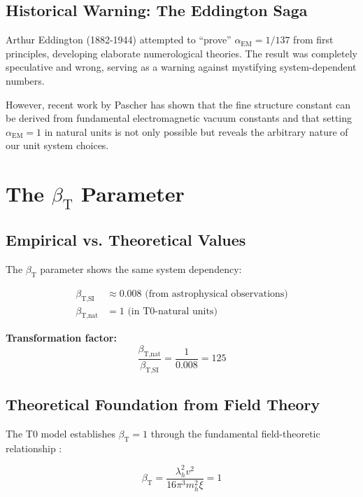 \documentclass[12pt,a4paper]{article}
\newcommand{\xipar}{\xi}
\newcommand{\lambdah}{\lambda_h}
\newcommand{\pichar}{\pi}
\newcommand{\betaTSI}{\beta_{\text{T,SI}}}
\newcommand{\betaTnat}{\beta_{\text{T,nat}}}
\begin{document}
	\subsection{Historical Warning: The Eddington Saga}
	\label{subsec:eddington_warning}
	
	Arthur Eddington (1882-1944) attempted to ``prove'' $\alpha_{\text{EM}} = 1/137$ from first principles, developing elaborate numerological theories. The result was completely speculative and wrong, serving as a warning against mystifying system-dependent numbers.
	
	However, recent work by Pascher \cite{pascher_feinstruktur_2025} has shown that the fine structure constant can be derived from fundamental electromagnetic vacuum constants and that setting $\alpha_{\text{EM}} = 1$ in natural units is not only possible but reveals the arbitrary nature of our unit system choices.
	
	\section{The $\beta_{\text{T}}$ Parameter}
	\label{sec:beta_t}
	
	\subsection{Empirical vs. Theoretical Values}
	\label{subsec:beta_empirical_theoretical}
	
	The $\beta_{\text{T}}$ parameter shows the same system dependency:
	
	\begin{align}
		\betaTSI &\approx 0.008 \text{ (from astrophysical observations)} \\
		\betaTnat &= 1 \text{ (in T0-natural units)}
	\end{align}
	
	\textbf{Transformation factor:}
	$$\frac{\betaTnat}{\betaTSI} = \frac{1}{0.008} = 125$$
	
	\subsection{Theoretical Foundation from Field Theory}
	\label{subsec:beta_field_theory}
	
	The T0 model establishes $\beta_{\text{T}} = 1$ through the fundamental field-theoretic relationship \cite{pascher_derivation_beta_2025}:
	
	\begin{equation}
		\beta_{\text{T}} = \frac{\lambdah^2 v^2}{16\pichar^3 m_h^2 \xipar} = 1
		\label{eq:beta_t_field_theory}
	\end{equation}
	
\end{document}
